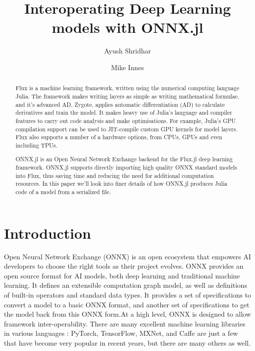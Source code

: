 \documentclass{juliacon}
\begin{document}
\title{Interoperating Deep Learning models with ONNX.jl}

\author[1]{Ayush Shridhar}
\author[2]{Mike Innes}



\maketitle

\begin{abstract}

Flux\cite{innes:2018} is a machine learning framework, written using the numerical computing
language Julia\cite{bezanson2017julia}. The framework makes writing layers as simple as
writing mathematical formulae, and it's advanced AD,
Zygote\cite{DBLP:journals/corr/abs-1810-07951}, applies automatic differentiation (AD) to
calculate derivatives and train the model. It makes heavy use of Julia's language and
compiler features to carry out code analysis and make optimisations.  For example, Julia's
GPU compilation support\cite{besard:2017} can be used to JIT-compile custom GPU kernels for
model layers\cite{CuArrays}. Flux also supports a number of a hardware options, from CPUs,
GPUs and even including TPUs.\newline

ONNX.jl is an Open Neural Network Exchange backend for the Flux.jl deep learning framework.
ONNX.jl supports directly importing high quality ONNX standard models into Flux, thus saving
time and reducing the need for additional computation resources. In this paper we'll look
into finer details of how ONNX.jl produces Julia code of a model from a serialized file.

\end{abstract}

\section{Introduction}

Open Neural Network Exchange (ONNX) is an open ecosystem that empowers AI developers to
choose the right tools as their project evolves. ONNX provides an open source format for AI
models, both deep learning and traditional machine learning. It defines an extensible
computation graph model, as well as definitions of built-in operators and standard data
types. It provides a set of specifications to convert a model to a basic ONNX format, and
another set of specifications to get the model back from this ONNX form.\newline  At a high
level, ONNX is designed to allow framework inter-operability. There are many excellent
machine learning libraries in various languages : PyTorch, TensorFlow, MXNet, and Caffe are
just a few that have become very popular in recent years, but there are many others as well.
\end{document}
